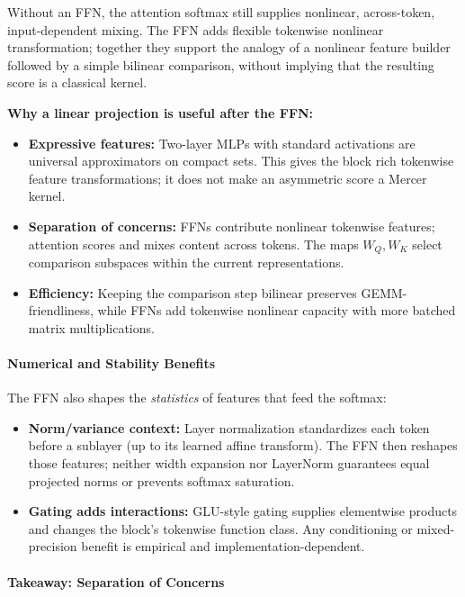 \documentclass{article}
\begin{document}
\begin{tcolorbox}[colback=blue!5!white, colframe=blue!75!black, title=A Kernel Analogy: The Role of the FFN]
Without an FFN, the attention softmax still supplies nonlinear, across-token,
input-dependent mixing. The FFN adds flexible tokenwise nonlinear transformation;
together they support the analogy of a nonlinear feature builder followed by a simple
bilinear comparison, without implying that the resulting score is a classical kernel.

\textbf{Why a linear projection is useful after the FFN:}
\begin{itemize}
  \item \textbf{Expressive features:} Two-layer MLPs with standard activations are
  universal approximators on compact sets. This gives the block rich tokenwise feature
  transformations; it does not make an asymmetric score a Mercer kernel.
  \item \textbf{Separation of concerns:} FFNs contribute nonlinear tokenwise features;
  attention scores and mixes content across tokens. The maps $W_Q, W_K$ select
  comparison subspaces within the current representations.
  \item \textbf{Efficiency:} Keeping the comparison step bilinear preserves
  GEMM-friendliness, while FFNs add tokenwise nonlinear capacity with more batched
  matrix multiplications.
\end{itemize}
\end{tcolorbox}

\paragraph{Numerical and Stability Benefits}

The FFN also shapes the \emph{statistics} of features that feed the softmax:
\begin{itemize}
  \item \textbf{Norm/variance context:} Layer normalization standardizes each token
  before a sublayer (up to its learned affine transform). The FFN then reshapes those
  features; neither width expansion nor LayerNorm guarantees equal projected norms or
  prevents softmax saturation.
  \item \textbf{Gating adds interactions:} GLU-style gating supplies elementwise
  products and changes the block's tokenwise function class. Any conditioning or
  mixed-precision benefit is empirical and implementation-dependent.
\end{itemize}

\paragraph{Takeaway: Separation of Concerns}
\end{document}
